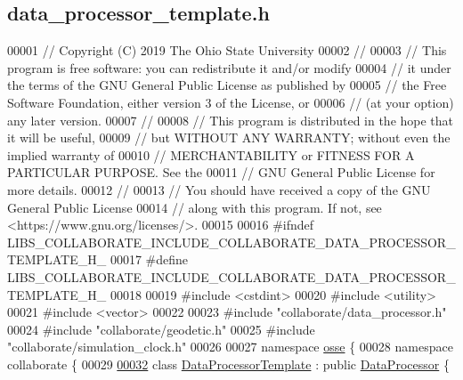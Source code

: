 \hypertarget{data__processor__template_8h_source}{}\subsection{data\+\_\+processor\+\_\+template.\+h}
\label{data__processor__template_8h_source}

\begin{DoxyCode}
00001 \textcolor{comment}{// Copyright (C) 2019 The Ohio State University}
00002 \textcolor{comment}{//}
00003 \textcolor{comment}{// This program is free software: you can redistribute it and/or modify}
00004 \textcolor{comment}{// it under the terms of the GNU General Public License as published by}
00005 \textcolor{comment}{// the Free Software Foundation, either version 3 of the License, or}
00006 \textcolor{comment}{// (at your option) any later version.}
00007 \textcolor{comment}{//}
00008 \textcolor{comment}{// This program is distributed in the hope that it will be useful,}
00009 \textcolor{comment}{// but WITHOUT ANY WARRANTY; without even the implied warranty of}
00010 \textcolor{comment}{// MERCHANTABILITY or FITNESS FOR A PARTICULAR PURPOSE.  See the}
00011 \textcolor{comment}{// GNU General Public License for more details.}
00012 \textcolor{comment}{//}
00013 \textcolor{comment}{// You should have received a copy of the GNU General Public License}
00014 \textcolor{comment}{// along with this program.  If not, see <https://www.gnu.org/licenses/>.}
00015 
00016 \textcolor{preprocessor}{#ifndef LIBS\_COLLABORATE\_INCLUDE\_COLLABORATE\_DATA\_PROCESSOR\_TEMPLATE\_H\_}
00017 \textcolor{preprocessor}{#define LIBS\_COLLABORATE\_INCLUDE\_COLLABORATE\_DATA\_PROCESSOR\_TEMPLATE\_H\_}
00018 
00019 \textcolor{preprocessor}{#include <cstdint>}
00020 \textcolor{preprocessor}{#include <utility>}
00021 \textcolor{preprocessor}{#include <vector>}
00022 
00023 \textcolor{preprocessor}{#include "collaborate/data\_processor.h"}
00024 \textcolor{preprocessor}{#include "collaborate/geodetic.h"}
00025 \textcolor{preprocessor}{#include "collaborate/simulation\_clock.h"}
00026 
00027 \textcolor{keyword}{namespace }\hyperlink{namespaceosse}{osse} \{
00028 \textcolor{keyword}{namespace }collaborate \{
00029 
\hyperlink{classosse_1_1collaborate_1_1_data_processor_template}{00032} \textcolor{keyword}{class }\hyperlink{classosse_1_1collaborate_1_1_data_processor_template}{DataProcessorTemplate} : \textcolor{keyword}{public} \hyperlink{classosse_1_1collaborate_1_1_data_processor}{DataProcessor} \{

\end{DoxyCode}
